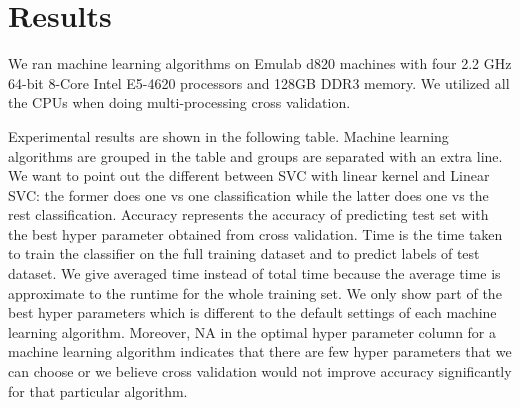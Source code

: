 \section{Results}
We ran machine learning algorithms on Emulab d820\cite{emulab-wiki} machines with four 2.2 GHz 64-bit 8-Core Intel E5-4620 processors and 128GB DDR3 memory. We utilized all the CPUs when doing multi-processing cross validation.

Experimental results are shown in the following table. Machine learning algorithms are grouped in the table and groups are separated with an extra line. We want to point out the different between SVC with linear kernel and Linear SVC: the former does one vs one classification while the latter does one vs the rest classification. Accuracy represents the accuracy of predicting test set with the best hyper parameter obtained from cross validation. Time is the time taken to train the classifier on the full training dataset and to predict labels of test dataset. We give averaged time instead of total time because the average time is approximate to the runtime for the whole training set. We only show part of the best hyper parameters which is different to the default settings of each machine learning algorithm. Moreover, NA in the optimal hyper parameter column for a machine learning algorithm indicates that there are few hyper parameters that we can choose or we believe cross validation would not improve accuracy significantly for that particular algorithm.

